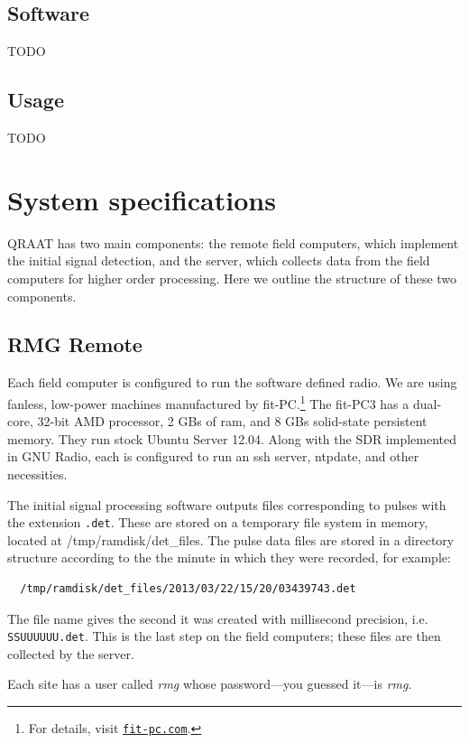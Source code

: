 \documentclass[letter]{article}
\newcounter{foot}
\begin{document}
\subsection{Software}

TODO 

\subsection{Usage}

TODO



\section{System specifications}
QRAAT has two main components: the remote field computers, which implement the initial 
signal detection, and the server, which collects data from the field computers for 
higher order processing. Here we outline the structure of these two components. 

\subsection{RMG Remote}
Each field computer is configured to run the software defined radio. We are using 
fanless, low-power machines manufactured by fit-PC.\footnote{For details, visit
\href{http://www.fit-pc.com}{\tt fit-pc.com}.} The fit-PC3 has a dual-core, 32-bit AMD
processor, 2 GBs of ram, and 8 GBs solid-state persistent memory. They 
run stock Ubuntu Server 12.04. Along with the SDR implemented in GNU Radio, each is 
configured to run an ssh server, ntpdate, and other necessities. 

The initial signal processing software outputs files corresponding to pulses 
with the extension \texttt{.det}. These are stored on a temporary file system in memory, 
located at /tmp/ramdisk/det\_files. The pulse data files are stored in a directory 
structure according to the the minute in which they were recorded, for example: 
\begin{verbatim}
  /tmp/ramdisk/det_files/2013/03/22/15/20/03439743.det
\end{verbatim}
The file name gives the second it was created with millisecond precision, i.e. 
\texttt{SSUUUUUU.det}. This is the last step on the field computers; these files are 
then collected by the server. 

Each site has a user called \textit{rmg} whose password---you guessed it---is \textit{rmg}. 
\end{document}
